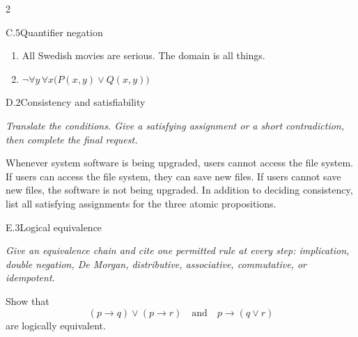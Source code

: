 \documentclass[9pt]{extarticle}
\begin{document}
\begin{multicols}{2}
\begin{CoreProblem}{C.5}{Quantifier negation}
\begin{enumerate}[label=(\alph*)]
  \item All Swedish movies are serious. The domain is all things.
  \item $\neg\forall y\,\forall x\bigl(P(x,y)\lor Q(x,y)\bigr)$
\end{enumerate}
\end{CoreProblem}
\columnbreak
\begin{CoreProblem}{D.2}{Consistency and satisfiability}
{\scriptsize\textit{Translate the conditions. Give a satisfying assignment or a short contradiction, then complete the final request.}\par}
Whenever system software is being upgraded, users cannot access the file
system. If users can access the file system, they can save new files. If users
cannot save new files, the software is not being upgraded. In addition to
deciding consistency, list all satisfying assignments for the three atomic
propositions.
\end{CoreProblem}
\begin{CoreProblem}{E.3}{Logical equivalence}
{\scriptsize\textit{Give an equivalence chain and cite one permitted rule at every step: implication, double negation, De Morgan, distributive, associative, commutative, or idempotent.}\par}
Show that
\[
  (p\to q)\lor(p\to r)
  \quad\text{and}\quad
  p\to(q\lor r)
\]
are logically equivalent.
\end{CoreProblem}
\end{multicols}
\CoreWorkArea
\FormBreak
{}
\end{document}
